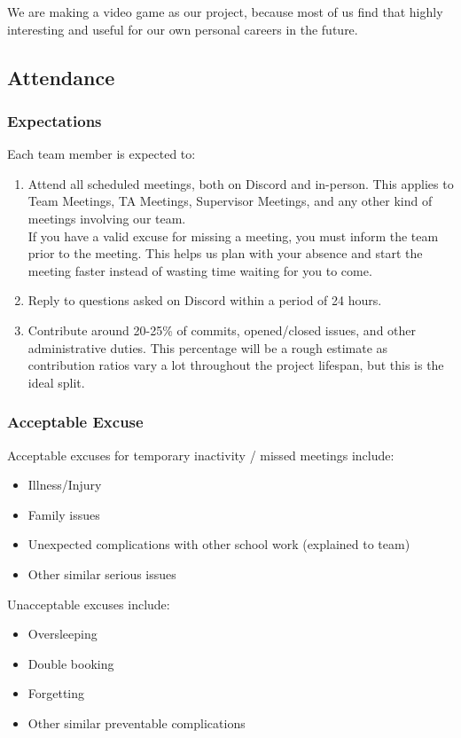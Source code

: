 \documentclass{article}
\begin{document}
We are making a video game as our project, because most of us find that highly interesting and useful for our own personal careers in the future.\\

\subsection*{Attendance}

\subsubsection*{Expectations}

Each team member is expected to:
\begin{enumerate}
\item{Attend all scheduled meetings, both on Discord and in-person. This applies to Team Meetings, TA Meetings, Supervisor Meetings, and any other kind of meetings involving our team.\\ If you have a valid excuse for missing a meeting, you must inform the team prior to the meeting. This helps us plan with your absence and start the meeting faster instead of wasting time waiting for you to come.}
\item{Reply to questions asked on Discord within a period of 24 hours.}
\item{Contribute around 20-25\% of commits, opened/closed issues, and other administrative duties. This percentage will be a rough estimate as contribution ratios vary a lot throughout the project lifespan, but this is the ideal split.}
\end{enumerate}

\subsubsection*{Acceptable Excuse}

Acceptable excuses for temporary inactivity / missed meetings include:
\begin{itemize}
\item{Illness/Injury}
\item{Family issues}
\item{Unexpected complications with other school work (explained to team)}
\item{Other similar serious issues}
\end{itemize}

Unacceptable excuses include:
\begin{itemize}
\item{Oversleeping}
\item{Double booking}
\item{Forgetting}
\item{Other similar preventable complications
}
\end{itemize}
\end{document}
